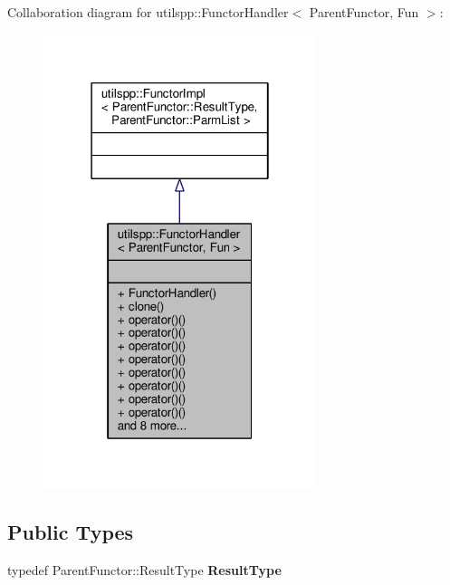 Collaboration diagram for utilspp\-:\-:Functor\-Handler$<$ Parent\-Functor, Fun $>$\-:
\nopagebreak
\begin{figure}[H]
\begin{center}
\leavevmode
\includegraphics[width=226pt]{classutilspp_1_1FunctorHandler__coll__graph}
\end{center}
\end{figure}
\subsection*{Public Types}
\begin{DoxyCompactItemize}
\item 
\hypertarget{classutilspp_1_1FunctorHandler_ac1582c39cb3d20184679a1b17039fb8a}{typedef Parent\-Functor\-::\-Result\-Type {\bfseries Result\-Type}}\label{classutilspp_1_1FunctorHandler_ac1582c39cb3d20184679a1b17039fb8a}

\end{DoxyCompactItemize}
